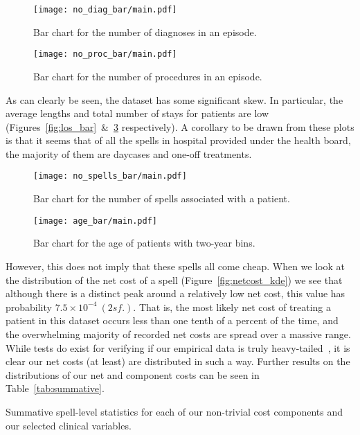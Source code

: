 \begin{figure}[htbp]
    \centering
    \texttt{[image: no\_diag\_bar/main.pdf]}
    \caption{Bar chart for the number of diagnoses in an
        episode.}\label{fig:no_diag_bar}
\end{figure}

\begin{figure}[htbp]
    \centering
    \texttt{[image: no\_proc\_bar/main.pdf]}
    \caption{Bar chart for the number of procedures in an
        episode.}\label{fig:no_proc_bar}
\end{figure}

As can clearly be seen, the dataset has some significant skew. In particular,
the average lengths and total number of stays for patients are low
(Figures~\ref{fig:los_bar}~\&~\ref{fig:no_spells_bar} respectively). A
corollary to be drawn from these plots is that it seems that of all the spells
in hospital provided under the health board, the majority of them are daycases
and one-off treatments.

\begin{figure}[htbp]
    \centering
    \texttt{[image: no\_spells\_bar/main.pdf]}
    \caption{Bar chart for the number of spells associated with a
        patient.}\label{fig:no_spells_bar}
\end{figure}

\begin{figure}[htbp]
    \centering
    \texttt{[image: age\_bar/main.pdf]}
    \caption{Bar chart for the age of patients with two-year
        bins.}\label{fig:age_bar}
\end{figure}

However, this does not imply that these spells all come cheap. When we look at
the distribution of the net cost of a spell (Figure~\ref{fig:netcost_kde}) we
see that although there is a distinct peak around a relatively low net cost,
this value has probability \(7.5\times10^{-4}\ (2 sf.)\). That is, the most
likely net cost of treating a patient in this dataset occurs less than one tenth
of a percent of the time, and the overwhelming majority of recorded net costs
are spread over a massive range. While tests do exist for verifying if our
empirical data is truly heavy-tailed~\cite{Bryson1974}, it is clear our net
costs (at least) are distributed in such a way. Further results on the
distributions of our net and component costs can be seen in
Table~\ref{tab:summative}.

\begin{table}[htbp!]
    \resizebox{\textwidth}{!}{%
        
    }
    \resizebox{\textwidth}{!}{%
        
    }
    \resizebox{\textwidth}{!}{%
        
    }
    \caption{Summative spell-level statistics for each of our non-trivial cost
    components and our selected clinical variables.}\label{tab:summative}
\end{table}

